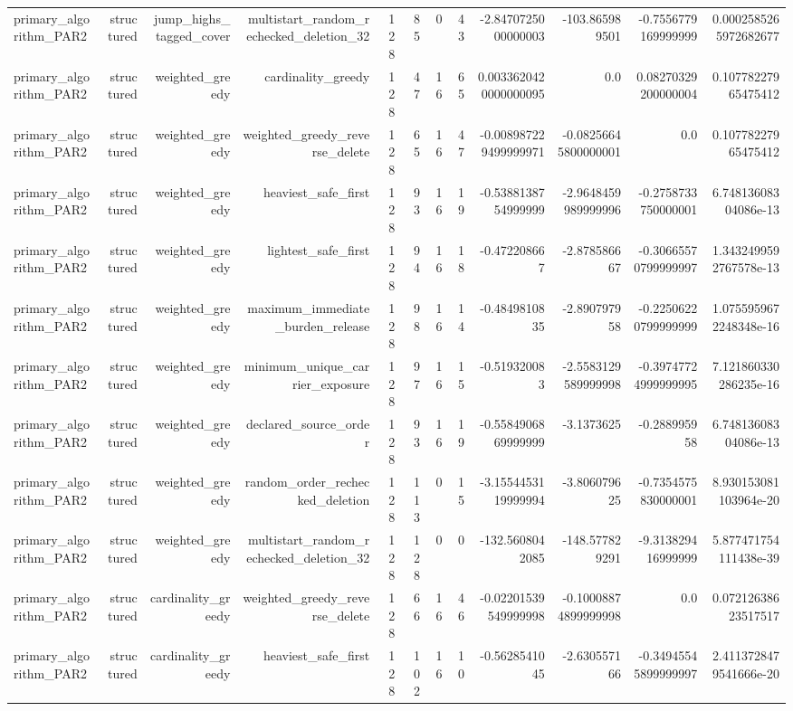{\begin{longtable}{lrrrrrrrrrrr}
primary\_algorithm\_PAR2 & structured & jump\_highs\_tagged\_cover & multistart\_random\_rechecked\_deletion\_32 & 128 & 85 & 0 & 43 & -2.8470725000000003 & -103.865989501 & -0.7556779169999999 & 0.0002585265972682677 \\
primary\_algorithm\_PAR2 & structured & weighted\_greedy & cardinality\_greedy & 128 & 47 & 16 & 65 & 0.0033620420000000095 & 0.0 & 0.08270329200000004 & 0.10778227965475412 \\
primary\_algorithm\_PAR2 & structured & weighted\_greedy & weighted\_greedy\_reverse\_delete & 128 & 65 & 16 & 47 & -0.008987229499999971 & -0.08256645800000001 & 0.0 & 0.10778227965475412 \\
primary\_algorithm\_PAR2 & structured & weighted\_greedy & heaviest\_safe\_first & 128 & 93 & 16 & 19 & -0.5388138754999999 & -2.9648459989999996 & -0.2758733750000001 & 6.74813608304086e-13 \\
primary\_algorithm\_PAR2 & structured & weighted\_greedy & lightest\_safe\_first & 128 & 94 & 16 & 18 & -0.472208667 & -2.878586667 & -0.30665570799999997 & 1.3432499592767578e-13 \\
primary\_algorithm\_PAR2 & structured & weighted\_greedy & maximum\_immediate\_burden\_release & 128 & 98 & 16 & 14 & -0.4849810835 & -2.890797958 & -0.22506220799999999 & 1.0755959672248348e-16 \\
primary\_algorithm\_PAR2 & structured & weighted\_greedy & minimum\_unique\_carrier\_exposure & 128 & 97 & 16 & 15 & -0.519320083 & -2.5583129589999998 & -0.39747724999999995 & 7.121860330286235e-16 \\
primary\_algorithm\_PAR2 & structured & weighted\_greedy & declared\_source\_order & 128 & 93 & 16 & 19 & -0.5584906869999999 & -3.1373625 & -0.288995958 & 6.74813608304086e-13 \\
primary\_algorithm\_PAR2 & structured & weighted\_greedy & random\_order\_rechecked\_deletion & 128 & 113 & 0 & 15 & -3.1554453119999994 & -3.806079625 & -0.7354575830000001 & 8.930153081103964e-20 \\
primary\_algorithm\_PAR2 & structured & weighted\_greedy & multistart\_random\_rechecked\_deletion\_32 & 128 & 128 & 0 & 0 & -132.5608042085 & -148.577829291 & -9.313829416999999 & 5.877471754111438e-39 \\
primary\_algorithm\_PAR2 & structured & cardinality\_greedy & weighted\_greedy\_reverse\_delete & 128 & 66 & 16 & 46 & -0.02201539549999998 & -0.10008874899999998 & 0.0 & 0.07212638623517517 \\
primary\_algorithm\_PAR2 & structured & cardinality\_greedy & heaviest\_safe\_first & 128 & 102 & 16 & 10 & -0.5628541045 & -2.630557166 & -0.34945545899999997 & 2.4113728479541666e-20 \\

\end{longtable}}
